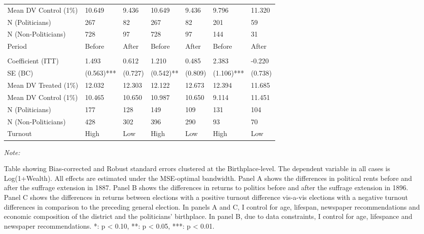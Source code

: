\begin{table}[!h]
{\begin{threeparttable}
\begin{tabular}[t]{lllllll}
\hspace{1em}Mean DV Control (1\%) & 10.649 & 9.436 & 10.649 & 9.436 & 9.796 & 11.320\\
\hspace{1em}N (Politicians) & 267 & 82 & 267 & 82 & 201 & 59\\
\hspace{1em}N (Non-Politicians) & 728 & 97 & 728 & 97 & 144 & 31\\
\hspace{1em}Period & Before & After & Before & After & Before & After\\
\addlinespace[0.3em]
\multicolumn{7}{l}{\textbf{High and Low Turnout}}\\
\hspace{1em}Coefficient (ITT) & 1.493 & 0.612 & 1.210 & 0.485 & 2.383 & -0.220\\
\hspace{1em}SE (BC) & (0.563)*** & (0.727) & (0.542)** & (0.809) & (1.106)*** & (0.738)\\
\hspace{1em}Mean DV Treated (1\%) & 12.032 & 12.303 & 12.122 & 12.673 & 12.394 & 11.685\\
\hspace{1em}Mean DV Control (1\%) & 10.465 & 10.650 & 10.987 & 10.650 & 9.114 & 11.451\\
\hspace{1em}N (Politicians) & 177 & 128 & 149 & 109 & 131 & 104\\
\hspace{1em}N (Non-Politicians) & 428 & 302 & 396 & 290 & 93 & 70\\
\hspace{1em}Turnout & High & Low & High & Low & High & Low\\
\bottomrule
\end{tabular}
\begin{tablenotes}[para]
\item \textit{Note: } 
\item Table showing Bias-corrected and Robust standard errors clustered at the Birthplace-level. The dependent variable in all cases is Log(1+Wealth). All effects are estimated under the MSE-optimal bandwidth. Panel A shows the differences in political rents before and after the suffrage extension in 1887. Panel B shows the differences in returns to politics before and after the suffrage extension in 1896. Panel C shows the differences in returns between elections with a positive turnout difference vis-a-vis elections with a negative turnout differences in comparison to the preceding general election. In panels A and C, I control for age, lifespan, newspaper recommendations and economic composition of the district and the politicians' birthplace. In panel B, due to data constraints, I control for age, lifespance and newspaper recommendations. *: p < 0.10, **: p < 0.05, ***: p < 0.01.
\end{tablenotes}
\end{threeparttable}}
\end{table}
